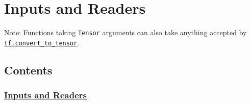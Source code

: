 

\section{Inputs and Readers }\label{inputs-and-readers}

Note: Functions taking \texttt{Tensor} arguments can also take anything
accepted by
\href{../../api_docs/python/framework.md\#convert_to_tensor}{\texttt{tf.convert\_to\_tensor}}.

\subsection{Contents}\label{contents}

\subsubsection{\texorpdfstring{\protect\hyperlink{AUTOGENERATED-inputs-and-readers}{Inputs
and Readers}}{Inputs and Readers}}\label{inputs-and-readers-1}

